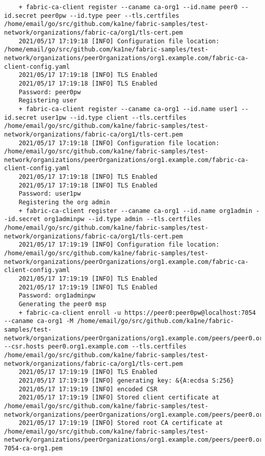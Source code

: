 \begin{lstlisting}
    + fabric-ca-client register --caname ca-org1 --id.name peer0 --id.secret peer0pw --id.type peer --tls.certfiles /home/email/go/src/github.com/ka1ne/fabric-samples/test-network/organizations/fabric-ca/org1/tls-cert.pem
    2021/05/17 17:19:18 [INFO] Configuration file location: /home/email/go/src/github.com/ka1ne/fabric-samples/test-network/organizations/peerOrganizations/org1.example.com/fabric-ca-client-config.yaml
    2021/05/17 17:19:18 [INFO] TLS Enabled
    2021/05/17 17:19:18 [INFO] TLS Enabled
    Password: peer0pw
    Registering user
    + fabric-ca-client register --caname ca-org1 --id.name user1 --id.secret user1pw --id.type client --tls.certfiles /home/email/go/src/github.com/ka1ne/fabric-samples/test-network/organizations/fabric-ca/org1/tls-cert.pem
    2021/05/17 17:19:18 [INFO] Configuration file location: /home/email/go/src/github.com/ka1ne/fabric-samples/test-network/organizations/peerOrganizations/org1.example.com/fabric-ca-client-config.yaml
    2021/05/17 17:19:18 [INFO] TLS Enabled
    2021/05/17 17:19:18 [INFO] TLS Enabled
    Password: user1pw
    Registering the org admin
    + fabric-ca-client register --caname ca-org1 --id.name org1admin --id.secret org1adminpw --id.type admin --tls.certfiles /home/email/go/src/github.com/ka1ne/fabric-samples/test-network/organizations/fabric-ca/org1/tls-cert.pem
    2021/05/17 17:19:19 [INFO] Configuration file location: /home/email/go/src/github.com/ka1ne/fabric-samples/test-network/organizations/peerOrganizations/org1.example.com/fabric-ca-client-config.yaml
    2021/05/17 17:19:19 [INFO] TLS Enabled
    2021/05/17 17:19:19 [INFO] TLS Enabled
    Password: org1adminpw
    Generating the peer0 msp
    + fabric-ca-client enroll -u https://peer0:peer0pw@localhost:7054 --caname ca-org1 -M /home/email/go/src/github.com/ka1ne/fabric-samples/test-network/organizations/peerOrganizations/org1.example.com/peers/peer0.org1.example.com/msp --csr.hosts peer0.org1.example.com --tls.certfiles /home/email/go/src/github.com/ka1ne/fabric-samples/test-network/organizations/fabric-ca/org1/tls-cert.pem
    2021/05/17 17:19:19 [INFO] TLS Enabled
    2021/05/17 17:19:19 [INFO] generating key: &{A:ecdsa S:256}
    2021/05/17 17:19:19 [INFO] encoded CSR
    2021/05/17 17:19:19 [INFO] Stored client certificate at /home/email/go/src/github.com/ka1ne/fabric-samples/test-network/organizations/peerOrganizations/org1.example.com/peers/peer0.org1.example.com/msp/signcerts/cert.pem
    2021/05/17 17:19:19 [INFO] Stored root CA certificate at /home/email/go/src/github.com/ka1ne/fabric-samples/test-network/organizations/peerOrganizations/org1.example.com/peers/peer0.org1.example.com/msp/cacerts/localhost-7054-ca-org1.pem

\end{lstlisting}
